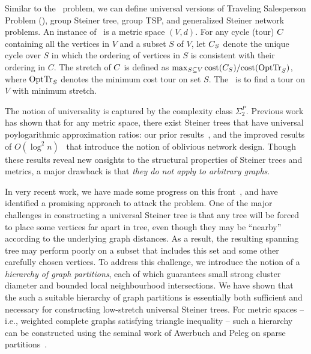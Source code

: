 Similar to the \ust\ problem, we can define universal versions of
Traveling Salesperson Problem (\utsp), group Steiner tree, group TSP,
and generalized Steiner network problems.  An instance of \utsp\ is a
metric space $(V,d)$.  For any cycle (tour) $C$ containing all the
vertices in $V$ and a subset $S$ of $V$, let $C_S$ denote the unique
cycle over $S$ in which the ordering of vertices in $S$ is consistent
with their ordering in $C$.  The stretch of $C$ is defined as
$\max_{S\subseteq V} \mbox{cost}(C_{S})/\mbox{cost}(\mbox{OptTr}_{S})$, where $\mbox{OptTr}_{S}$
denotes the minimum cost tour on set $S$. The \utsp\ is to find a tour
on $V$ with minimum stretch.


The notion of universality is captured by the complexity class
$\Sigma_2^P$.  Previous work has shown that for any metric space,
there exist Steiner trees that have universal poylogarithmic
approximation ratios: our prior results~\cite{jia+lnrs:universal}, and
the improved results of $O(\log^2 n)$~\cite{gupta+hr:oblivious} that
introduce the notion of oblivious network design.  Though these
results reveal new onsights to the structural properties of Steiner
trees and metrics, a major drawback is that {\em they do not apply to
  arbitrary graphs}.

In very recent work, we have made some progress on this
front~\cite{busch+drrs:ust}, and have identified a promising approach
to attack the problem.  One of the major challenges in constructing a
universal Steiner tree is that any tree will be forced to place some
vertices far apart in tree, even though they may be ``nearby''
according to the underlying graph distances.  As a result, the
resulting spanning tree may perform poorly on a subset that includes
this set and some other carefully chosen vertices.  To address this
challenge, we introduce the notion of a {\em hierarchy of graph
  partitions}, each of which guarantees small strong cluster diameter
and bounded local neighbourhood intersections.  We have shown that the
such a suitable hierarchy of graph partitions is essentially both
sufficient and necessary for constructing low-stretch universal
Steiner trees.  For metric spaces -- i.e., weighted complete graphs
satisfying triangle inequality -- such a hierarchy can be constructed
using the seminal work of Awerbuch and Peleg on sparse
partitions~\cite{awerbuch+p:partition,peleg:distributeBook}.

